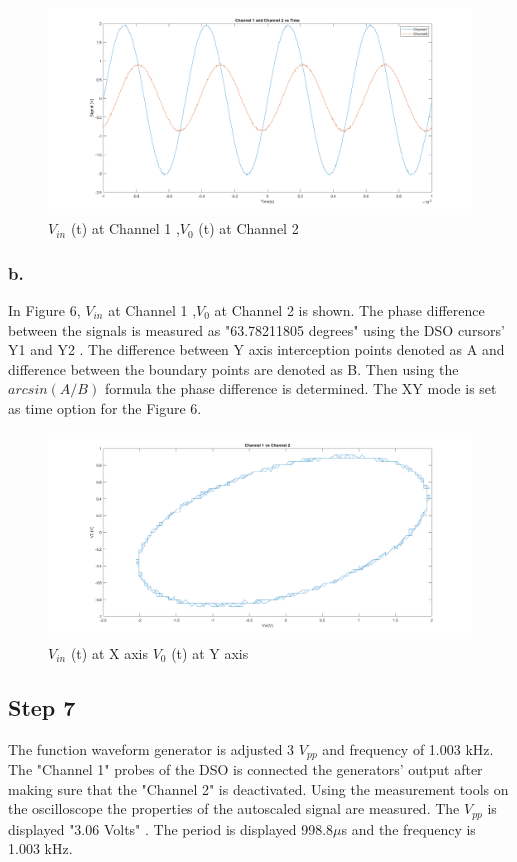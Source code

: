 \documentclass[letterpaper,12pt]{article}
\begin{document}
\begin{figure}[!ht]
	\caption{\( V_{in}\) (t) at Channel 1 ,\( V_0 \) (t) at Channel 2  }
	\centering
	\includegraphics[width=1\textwidth]{6a.png}
\end{figure}

\subsubsection{b.}
In Figure 6, \( V_{in}\) at Channel 1 ,\( V_0 \) at Channel 2 is shown. The phase difference between the signals is measured as "63.78211805 degrees" using the DSO cursors' Y1 and Y2 . The difference between Y axis interception points denoted as A and  difference between the boundary points are denoted as B. Then using the \(arcsin({A}/{B})\) formula the phase difference is determined. The XY mode is set as time option for the Figure 6.
\begin{figure}[!ht]
	\caption{\( V_{in}\) (t) at X axis \( V_0 \) (t) at Y axis  }
	\centering
	\includegraphics[width=1\textwidth]{6b.png}
\end{figure}

\subsection{Step 7}
The function waveform generator is adjusted 3 \(V_{pp}\) and frequency of 1.003 kHz. The "Channel 1" probes of the DSO is connected the generators' output after making sure that the "Channel 2" is deactivated. Using the measurement tools on the oscilloscope the properties of the autoscaled signal are measured. The  \(V_{pp}\) is displayed "3.06 Volts" . The period is displayed 998.8\( \mu \)s and the frequency is 1.003 kHz.
\end{document}
